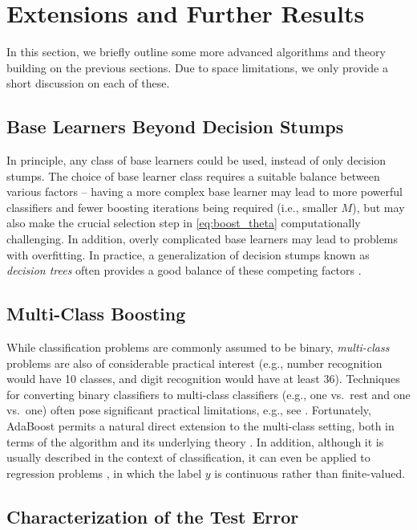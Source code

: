 \documentclass[english]{article}
\begin{document}
\section{Extensions and Further Results} \label{sec:ext}

In this section, we briefly outline some more advanced algorithms and theory building on the previous sections.  Due to space limitations, we only provide a short discussion on each of these.

\subsection{Base Learners Beyond Decision Stumps} \label{sec:base}

In principle, any class of base learners could be used, instead of only decision stumps.  The choice of base learner class requires a suitable balance between various factors -- having a more complex base learner may lead to more powerful classifiers and fewer boosting iterations being required (i.e., smaller $M$), but may also make the crucial selection step in \eqref{eq:boost_theta} computationally challenging.  In addition, overly complicated base learners may lead to problems with overfitting.  In practice, a generalization of decision stumps known as {\em decision trees} often provides a good balance of these competing factors \cite{blog}.

\subsection{Multi-Class Boosting} \label{sec:multi}

While classification problems are commonly assumed to be binary, {\em multi-class} problems are also of considerable practical interest (e.g., number recognition would have 10 classes, and digit recognition would have at least 36).  Techniques for converting binary classifiers to multi-class classifiers (e.g., one vs.~rest and one vs.~one) often pose significant practical limitations, e.g., see \cite[Section 4.1.2]{bishop2006pattern}.  Fortunately, AdaBoost permits a natural direct extension to the multi-class setting, both in terms of the algorithm and its underlying theory \cite{saberian2011multiclass}.  In addition, although it is usually described in the context of classification, it can even be applied to regression problems \cite{scikit}, in which the label $y$ is continuous rather than finite-valued.

\subsection{Characterization of the Test Error} \label{sec:test_error}
\end{document}
